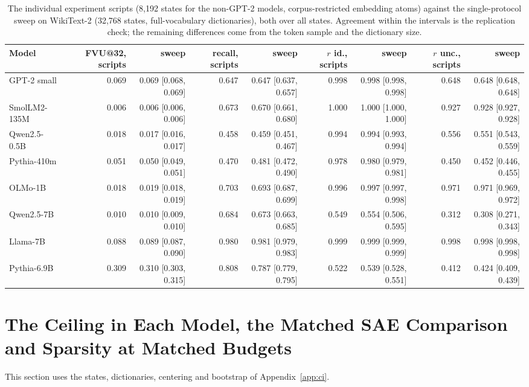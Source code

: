 \begin{table}[H]\centering\scriptsize
\caption{The individual experiment scripts (8{,}192 states for the non-GPT-2 models, corpus-restricted embedding atoms) against the single-protocol sweep on WikiText-2 (32{,}768 states, full-vocabulary dictionaries), both over all states. Agreement within the intervals is the replication check; the remaining differences come from the token sample and the dictionary size.}\label{app:ci-old}
\begin{adjustbox}{max width=\linewidth}
\begin{tabular}{lrrrrrrrr}\toprule
Model & FVU@32, scripts & sweep & recall, scripts & sweep & $r$ id., scripts & sweep & $r$ unc., scripts & sweep \\ \midrule
GPT-2 small & 0.069 & 0.069 [0.068, 0.069] & 0.647 & 0.647 [0.637, 0.657] & 0.998 & 0.998 [0.998, 0.998] & 0.648 & 0.648 [0.648, 0.648] \\
SmolLM2-135M & 0.006 & 0.006 [0.006, 0.006] & 0.673 & 0.670 [0.661, 0.680] & 1.000 & 1.000 [1.000, 1.000] & 0.927 & 0.928 [0.927, 0.928] \\
Qwen2.5-0.5B & 0.018 & 0.017 [0.016, 0.017] & 0.458 & 0.459 [0.451, 0.467] & 0.994 & 0.994 [0.993, 0.994] & 0.556 & 0.551 [0.543, 0.559] \\
Pythia-410m & 0.051 & 0.050 [0.049, 0.051] & 0.470 & 0.481 [0.472, 0.490] & 0.978 & 0.980 [0.979, 0.981] & 0.450 & 0.452 [0.446, 0.455] \\
OLMo-1B & 0.018 & 0.019 [0.018, 0.019] & 0.703 & 0.693 [0.687, 0.699] & 0.996 & 0.997 [0.997, 0.998] & 0.971 & 0.971 [0.969, 0.972] \\
Qwen2.5-7B & 0.010 & 0.010 [0.009, 0.010] & 0.684 & 0.673 [0.663, 0.685] & 0.549 & 0.554 [0.506, 0.595] & 0.312 & 0.308 [0.271, 0.343] \\
Llama-7B & 0.088 & 0.089 [0.087, 0.090] & 0.980 & 0.981 [0.979, 0.983] & 0.999 & 0.999 [0.999, 0.999] & 0.998 & 0.998 [0.998, 0.998] \\
Pythia-6.9B & 0.309 & 0.310 [0.303, 0.315] & 0.808 & 0.787 [0.779, 0.795] & 0.522 & 0.539 [0.528, 0.551] & 0.412 & 0.424 [0.409, 0.439] \\
\bottomrule\end{tabular}\end{adjustbox}
\end{table}

\section{The Ceiling in Each Model, the Matched SAE Comparison and Sparsity at Matched Budgets}\label{app:z}
This section uses the states, dictionaries, centering and bootstrap of Appendix~\ref{app:ci}.
